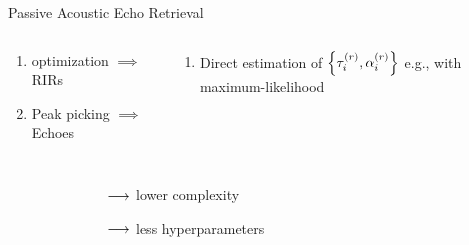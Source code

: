 \begin{frame}[t]{\alert{Passive} Acoustic Echo Retrieval \hfill\faBook}
        \pause
        \vspace{.5em}
        \begin{columns}[T,onlytextwidth] %
            \begin{column}{.48\textwidth}
                \small
                \begin{enumerate}
                    \item {} optimization $\implies$ RIRs
                    \item Peak picking $\implies$ Echoes
                \end{enumerate}
            \end{column}
            \begin{column}{.48\textwidth}
                \small
                \begin{enumerate}
                    \item Direct estimation of $\set{\tauir, \ampir}$
                    e.g., with maximum-likelihood
                \end{enumerate}
            \end{column}%
        \end{columns}

        \pause
        \vspace{1em}
        \begin{columns}[T,onlytextwidth] %
                \small
                \begin{itemize}
                    \item[\cmark] 
                    \item[\cmark] 
                    \\{\scriptsize~\cite{crocco2016estimation}}
                \end{itemize}
                \small
                \begin{itemize}
                    \item[\cmark] 
                    \begin{itemize}\footnotesize
                        \item[$\longrightarrow$] lower complexity
                        \item[$\longrightarrow$] less hyperparameters
                    \end{itemize}
                    \end{itemize}
        \end{columns}


\end{frame}
